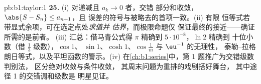 \begin{solution}{pb:b1:taylor:1}
\textbf{25.} (i) 对递减且 $a_k \to 0$ 者，交错
部分和收敛，$\abs{S - S_n} \leq a_{n+1}$，且
误差的符号与被略去的首项一致。(ii) 有限
恒等式若带显式余项，可在选定点处\emph{求值并
估界}，而极限命题仅
保证最终的接近——确证所需的是前者。
(iii) 汇总：借马青公式得 $\pi$ 精确到 $5\cdot10^{-8}$，$\ln 2$ 精确到
十位小数（借 $\frac13$ 级数），$\cos 1$、
$\sin 1$、$\cosh 1$、$\cos\frac1m$ 与 $\eu^{-1}$ 的无理性，
泰勒–拉格朗日等式，以及平坦函数的警示。(iv)
在\cref{ch:b1:series}中，第 1 题推广为交错级数判别法，
区分绝对收敛与条件收敛，
其周末问题为重排的戏剧搭好舞台，
其中途径 1 的交错调和级数是
明星见证。
\end{solution}
